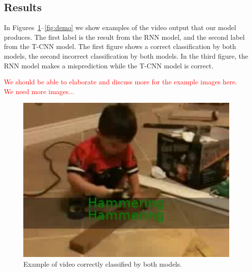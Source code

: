

\subsection{Results}
In Figures~\ref{fig:democorrect}--\ref{fig:demo} we show examples of the video output that our model produces. The first label is the result from the RNN model, and the second label from the T-CNN model. The first figure shows a correct classification by both models, the second incorrect classification by both models. In the third figure, the RNN model makes a misprediction while the T-CNN model is correct.  

\textcolor{red}{We should be able to elaborate and discuss more for the example images here. We need more images...} 


\begin{figure}
  \centering
  \includegraphics[width=0.8\linewidth]{figs/democorrect}
  \caption{Example of video correctly classified by both models.}
  \label{fig:democorrect}
\end{figure}


